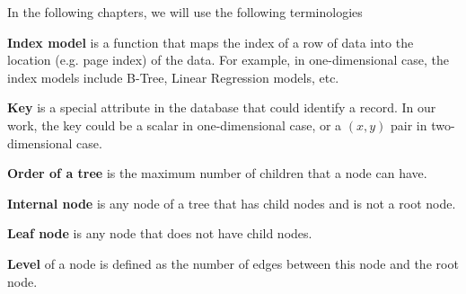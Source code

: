 In the following chapters, we will use the following terminologies

\textbf{Index model} is a function that maps the index of a row of data into the location (e.g. page index) of the data. For example, in one-dimensional case, the index models include B-Tree, Linear Regression models, etc.

\textbf{Key} is a special attribute in the database that could identify a record. In our work, the key could be a scalar in one-dimensional case, or a $(x,y)$ pair in two-dimensional case.

\textbf{Order of a tree} is the maximum number of children that a node can have.

\textbf{Internal node} is any node of a tree that has child nodes and is not a root node.

\textbf{Leaf node} is any node that does not have child nodes.

\textbf{Level} of a node is defined as the number of edges between this node and the root node.
